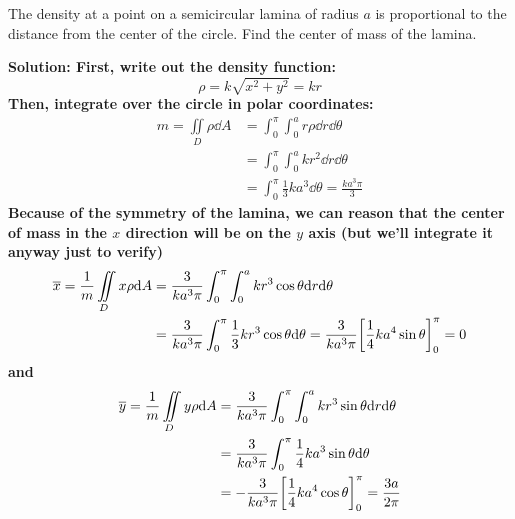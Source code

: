 \begin{example}
    The density at a point on a semicircular lamina of radius \( a \) is proportional to the distance from the center of the circle. Find the center of mass of the lamina. \par\bf{Solution: }First, write out the density function: 
    \[ \rho = k\sqrt{x^2+y^2} = kr \]
    Then, integrate over the circle in polar coordinates:
    \begin{align*}
        m = \iint\limits_D \rho\dd A &= \int_0^\pi\int_0^ar\rho\dd r\dd \theta \\
        &= \int_0^\pi\int_0^a kr^2\dd r\dd \theta \\
        &= \int_0^\pi \frac{1}{3}ka^3\dd \theta = \frac{ka^3\pi}{3}
    \end{align*}
    Because of the symmetry of the lamina, we can reason that the center of mass in the \( x \) direction will be on the \( y \) axis (but we'll integrate it anyway just to verify)
    \begin{align*}
        \overline{x} = \frac{1}{m}\iint\limits_D x\rho \dd A &= \frac{3}{ka^3\pi}\int_0^\pi\int_0^a kr^3\cos\theta \dd r\dd \theta \\
        &= \frac{3}{ka^3\pi}\int_0^\pi \frac{1}{3}kr^3\cos\theta\dd \theta = \frac{3}{ka^3\pi}\bqty{\frac{1}{4}ka^4\sin\theta}_0^\pi = 0
    \end{align*}
    and
    \begin{align*}
        \overline{y} = \frac{1}{m}\iint\limits_D y\rho\dd A &= \frac{3}{ka^3\pi}\int_0^\pi\int_0^a kr^3\sin\theta \dd r\dd \theta \\
        &= \frac{3}{ka^3\pi}\int_0^\pi \frac{1}{4}ka^3\sin\theta\dd \theta \\
        &= -\frac{3}{ka^3\pi}\bqty{\frac{1}{4}ka^4\cos\theta}_0^\pi = \frac{3a}{2\pi}
    \end{align*}
\end{example}
